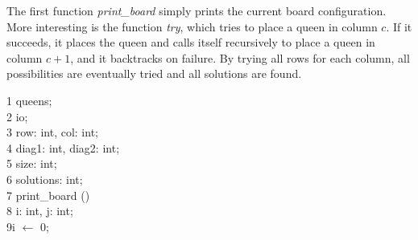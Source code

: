\begin{appendix}
The first function {\em print\_board} simply prints the current board
configuration.  More interesting is the function {\em try}, which
tries to place a queen in column $c$.  If it succeeds, it places the
queen and calls itself recursively to place a queen in column $c + 1$,
and it backtracks on failure.  By trying all rows for each column, all
possibilities are eventually tried and all solutions are found.

\begin{Program}
\begin{ttlprog}
1\>\ttlModule{} queens;\\
2\>\ttlImport{} io;\\
3\>\ttlVar{} row: \ttlArray{} \ttlOf{} int, col: \ttlArray{} \ttlOf{} int;\\
4\>\ttlVar{} diag1: \ttlArray{} \ttlOf{} int, diag2: \ttlArray{} \ttlOf{} int;\\
5\>\ttlVar{} size: int;\\
6\>\ttlVar{} solutions: int;\\
7\>\ttlFun{} print\_board ()\\
8\>\>\ttlVar{} i: int, j: int;\\
9\>\>i $\leftarrow$ 0;\\

\end{ttlprog}
\end{Program}
\end{appendix}
